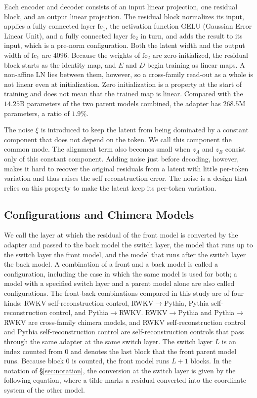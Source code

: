 \documentclass[conference]{IEEEtran}
\newcommand{\RWKVself}{RWKV self-reconstruction control}
\newcommand{\Pythiaself}{Pythia self-reconstruction control}
\newcommand{\RtoP}{RWKV$\to$\allowbreak Pythia}
\newcommand{\PtoR}{Pythia$\to$\allowbreak RWKV}
\begin{document}
Each encoder and decoder consists of an input linear projection, one residual block, and an output linear projection. The residual
block normalizes its input, applies a fully connected layer $\mathrm{fc}_1$, the activation function GELU (Gaussian Error Linear Unit),
and a fully connected layer $\mathrm{fc}_2$ in turn, and adds the result to its input, which is a pre-norm configuration.
Both the latent width and the output width of $\mathrm{fc}_1$ are $4096$. Because the weights of $\mathrm{fc}_2$ are zero-initialized,
the residual block starts as the identity map, and $E$ and $D$ begin training as linear maps. A non-affine LN lies between them,
however, so a cross-family read-out as a whole is not linear even at initialization.
Zero initialization is a property at the start of training and does not mean that the trained map is linear. Compared with the $14.25$B
parameters of the two parent models combined, the adapter has $268.5$M parameters, a ratio of $1.9\%$.

The noise $\xi$ is introduced to keep the latent from being dominated by a constant component that does not depend on the token.
We call this component the common mode.
The alignment term also becomes small when $z_A$ and $z_B$ consist only of this constant component. Adding noise
just before decoding, however, makes it hard to recover the original residuals from a latent with little per-token variation and thus
raises the self-reconstruction error. The noise is a design that relies on this property to make the latent keep its per-token
variation.

\subsection{Configurations and Chimera Models}\label{sec:config}
We call the layer at which the residual of the front model is converted by the adapter and passed to the back model the switch layer, the model that runs up to the switch
layer the front model, and the model that runs after the switch layer the back model. A combination of a front and a back model is
called a configuration, including the case in which the same model is used for both; a model with a specified switch layer and a
parent model alone are also called configurations.
The front-back combinations compared in this study are of four kinds: \RWKVself{}, \RtoP{}, \Pythiaself{}, and \PtoR{}.
\RtoP{} and \PtoR{} are cross-family chimera models, and \RWKVself{} and \Pythiaself{} are self-reconstruction controls that pass
through the same adapter at the same switch layer. The switch layer $L$ is an index counted from $0$ and denotes the last block that
the front parent model runs. Because block $0$ is counted, the front model runs $L{+}1$ blocks.
In the notation of \S\ref{sec:notation}, the conversion at the switch layer is given by the following equation, where a tilde marks
a residual converted into the coordinate system of the other model.
\end{document}
